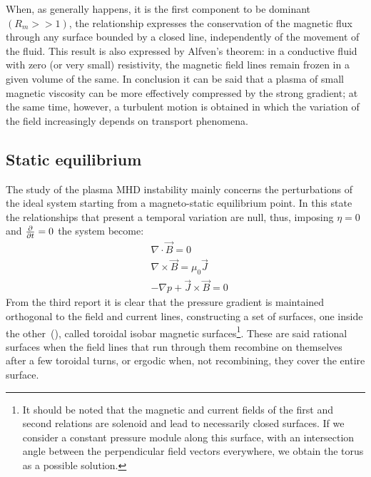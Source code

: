 When, as generally happens, it is the first component to be dominant $(R_m >> 1)$, the relationship expresses the conservation of the magnetic flux through any surface bounded by a closed line, independently of the movement of the fluid. This result is also expressed by Alfven's theorem: in a conductive fluid with zero (or very small) resistivity, the magnetic field lines remain frozen in a given volume of the same.
In conclusion it can be said that a plasma of small magnetic viscosity can be more effectively compressed by the strong gradient; at the same time, however, a turbulent motion is obtained in which the variation of the field increasingly depends on transport phenomena.




\subsection{Static equilibrium}
The study of the plasma MHD instability mainly concerns the perturbations of the ideal system starting from a magneto-static equilibrium point. In this state the relationships that present a temporal variation are null, thus, imposing $\eta=0$ and $\pdv{}{t} = 0$ the system become:
\begin{align}
    & \nabla \cdot \Vec{B} = 0 \\
    & \nabla \times \Vec{B} = \mu_0 \Vec{J} \\
    & -\nabla p + \Vec{J} \times \Vec{B} = 0
\end{align}
From the third report it is clear that the pressure gradient is maintained orthogonal to the field and current lines, constructing a set of surfaces, one inside the other~(\Figure{}), called toroidal isobar magnetic surfaces\footnote{It should be noted that the magnetic and current fields of the first and second relations are solenoid and lead to necessarily closed surfaces. If we consider a constant pressure module along this surface, with an intersection angle between the perpendicular field vectors everywhere, we obtain the torus as a possible solution.}. These are said rational surfaces when the field lines that run through them recombine on themselves after a few toroidal turns, or ergodic when, not recombining, they cover the entire surface.

